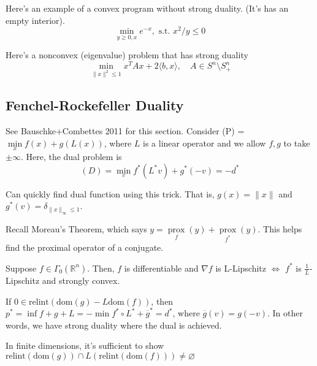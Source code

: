 \documentclass[english, 11pt]{article}
\DeclareMathOperator*{\prox}{prox}
\begin{document}
\begin{rem}
Here's an example of a convex program without strong duality. (It's has an empty interior).
\[
\min \limits_{y \ge 0, x} e^{-x}, \text{ s.t. } x^2/y\le 0
\]

Here's a nonconvex (eigenvalue) problem that has strong duality
\[
\min \limits_{\|x\|^2 \le 1} x^T A x + 2 \langle b, x \rangle, \quad A \in S^n \setminus S^n_+
\]
\end{rem}

\subsection{Fenchel-Rockefeller Duality}
See Bauschke+Combettes 2011 for this section. Consider (P) = $\min \limits_{x} f(x) + g(L(x))$, where $L$ is a linear operator and we allow $f,g$ to take $\pm \infty$. Here, the dual problem is
\[
(D) = \min \limits_{v} f^*(L^* v) + g^*(- v)= - d^*
\]

\begin{rem}
Can quickly find dual function using this trick. That is, $g(x) = \|x\|$ and $g^*(v) = \delta_{\|x\|_\infty \le 1}$. 
\end{rem}

\begin{rem}
Recall Moreau's Theorem, which says $y = \prox \limits_f(y) + \prox \limits_{f^*}(y)$. This helps find the proximal operator of a conjugate. 
\end{rem}


\begin{thrm}[18.15]
Suppose $f \in \Gamma_0(\mathbb{R}^n)$. Then, $f$ is differentiable and $\nabla f$ is L-Lipschitz $\iff$ $f^*$ is $\frac{1}{L}$-Lipschitz and strongly convex.
\end{thrm}

\begin{thrm}[15.23]
If $0 \in \text{relint}(\text{dom}(g) - L \text{dom}(f))$, then $p^* = \inf f+g+L = - \min f^* \circ L^* + \overline{g}^*= d^*$, where $\overline{g}(v) = g(-v)$. In other words, we have strong duality where the dual is achieved.
\end{thrm}

\begin{thrm}[15.24, 6.19]
In finite dimensions, it's sufficient to show $\text{relint}(\text{dom}(g)) \cap L(\text{relint}(\text{dom}(f))) \neq \varnothing$
\end{thrm}
\end{document}
